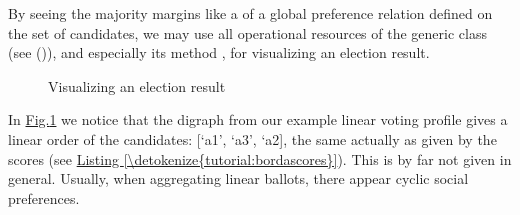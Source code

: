 \documentclass[a4paper,12pt,english]{sphinxhowto}
\let\sphinxpxdimen\pdfpxdimen\else\newdimen\sphinxpxdimen
\begin{document}
By seeing the majority margins like a  of a global preference relation defined on the set of candidates, we may use all operational resources of the generic  class (see {\hyperref[\detokenize{tutorial:digraphs-tutorial-label}]{}} ()), and especially its  method \sphinxfootnotemark[1], for visualizing an election result.

\begin{sphinxVerbatim}[commandchars=\\\{\},numbers=left,firstnumber=1,stepnumber=1]
\end{sphinxVerbatim}

\begin{figure}[H]
\centering
\capstart

\noindent\sphinxincludegraphics[width=300\sphinxpxdimen]{{tutorialLinearBallots}.png}
\caption{Visualizing an election result}\label{\detokenize{tutorial:tutoriallinearballots}}\end{figure}

In \hyperref[\detokenize{tutorial:tutoriallinearballots}]{Fig.\@ \ref{\detokenize{tutorial:tutoriallinearballots}}} we notice that the  digraph from our example linear voting profile gives a linear order of the candidates: {[}‘a1’, ‘a3’, ‘a2{]}, the same actually as given by the  scores (see \hyperref[\detokenize{tutorial:bordascores}]{Listing \ref{\detokenize{tutorial:bordascores}}}). This is by far not given in general. Usually, when aggregating linear ballots, there appear cyclic social preferences.
\end{document}
